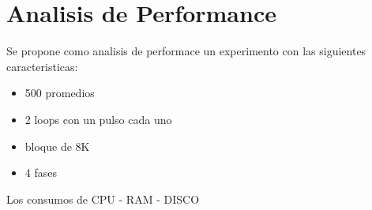 \section{Analisis de Performance}


Se propone como analisis de performace un experimento con las siguientes caracteristicas:

\begin{itemize}
\item 500 promedios
\item 2 loops con un pulso cada uno
\item bloque de 8K
\item 4 fases
\end{itemize}

Los consumos de CPU - RAM - DISCO
\newpage